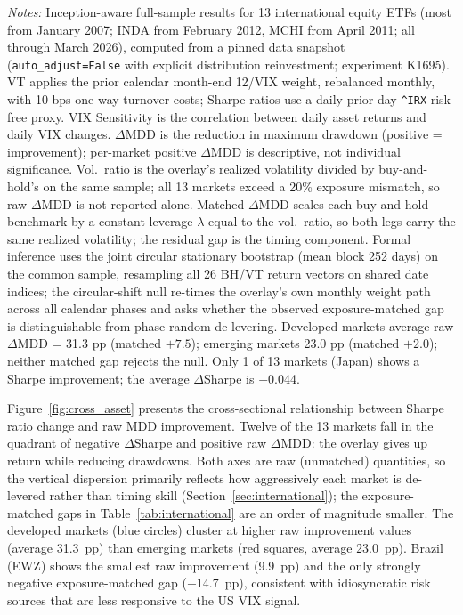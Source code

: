 \begin{table}[H]
\begin{threeparttable}
\begin{tabular}{@{}lccccccccc@{}}
\bottomrule
\end{tabular}
\begin{tablenotes}
\small
\item \textit{Notes:} Inception-aware full-sample results for 13 international equity ETFs (most from January 2007; INDA from February 2012, MCHI from April 2011; all through March 2026), computed from a pinned data snapshot (\texttt{auto\_adjust=False} with explicit distribution reinvestment; experiment K1695). VT applies the prior calendar month-end 12/VIX weight, rebalanced monthly, with 10 bps one-way turnover costs; Sharpe ratios use a daily prior-day \texttt{\^{}IRX} risk-free proxy. VIX Sensitivity is the correlation between daily asset returns and daily VIX changes. $\Delta$MDD is the reduction in maximum drawdown (positive = improvement); per-market positive $\Delta$MDD is descriptive, not individual significance. Vol.\ ratio is the overlay's realized volatility divided by buy-and-hold's on the same sample; all 13 markets exceed a 20\% exposure mismatch, so raw $\Delta$MDD is not reported alone. Matched $\Delta$MDD scales each buy-and-hold benchmark by a constant leverage $\lambda$ equal to the vol.\ ratio, so both legs carry the same realized volatility; the residual gap is the timing component. Formal inference uses the joint circular stationary bootstrap (mean block 252 days) on the common sample, resampling all 26 BH/VT return vectors on shared date indices; the circular-shift null re-times the overlay's own monthly weight path across all calendar phases and asks whether the observed exposure-matched gap is distinguishable from phase-random de-levering. Developed markets average raw $\Delta$MDD = 31.3 pp (matched $+7.5$); emerging markets 23.0 pp (matched $+2.0$); neither matched gap rejects the null. Only 1 of 13 markets (Japan) shows a Sharpe improvement; the average $\Delta$Sharpe is $-$0.044.
\end{tablenotes}
\end{threeparttable}
\end{table}

Figure~\ref{fig:cross_asset} presents the cross-sectional relationship between Sharpe ratio change and raw MDD improvement. Twelve of the 13 markets fall in the quadrant of negative $\Delta$Sharpe and positive raw $\Delta$MDD: the overlay gives up return while reducing drawdowns. Both axes are raw (unmatched) quantities, so the vertical dispersion primarily reflects how aggressively each market is de-levered rather than timing skill (Section~\ref{sec:international}); the exposure-matched gaps in Table~\ref{tab:international} are an order of magnitude smaller. The developed markets (blue circles) cluster at higher raw improvement values (average 31.3~pp) than emerging markets (red squares, average 23.0~pp). Brazil (EWZ) shows the smallest raw improvement (9.9~pp) and the only strongly negative exposure-matched gap ($-$14.7~pp), consistent with idiosyncratic risk sources that are less responsive to the US VIX signal.

